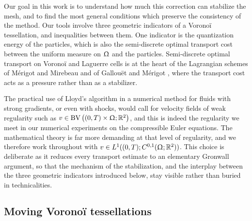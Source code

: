 \documentclass[letterpaper,11pt,twoside]{article}
\numberwithin{figure}{section}
\numberwithin{table}{section}
\theoremstyle{cpamplain}
\theoremstyle{cpamdefinition}
\newcommand{\R}{\mathbb{R}}
\let\Omega\Upomega
\numberwithin{equation}{section}
\begin{document}
Our goal in this work is to understand how much this correction can stabilize the mesh, and to find the most general conditions which preserve the consistency of the method. 
Our tools involve three geometric indicators of a Vorono\"i tessellation, and inequalities between them. One indicator is the quantization energy of the particles, which is also the semi-discrete optimal transport cost between the uniform measure on $\Omega$ and the particles. Semi-discrete optimal transport on Vorono\"i and Laguerre cells is at the heart of the Lagrangian schemes of M\'erigot and Mirebeau \cite{MerigotMirebeau2016} and of Gallou\"et and M\'erigot \cite{GallouetMerigot2018,gaga,caca}, where the transport cost acts as a pressure rather than as a stabilizer. 

The practical use of Lloyd's algorithm in a numerical method for fluids with strong gradients, or even with shocks, would call for velocity fields of weak regularity such as $v\in \mathrm{BV}\left((0,T)\times \Omega;\R^2\right)$, and this is indeed the regularity we meet in our numerical experiments on the compressible Euler equations.
The mathematical theory is far more demanding at that level of regularity, and we therefore work throughout with $v\in L^1((0,T);C^{0,1}(\Omega;\R^2))$.
This choice is deliberate as it reduces every transport estimate to an elementary Gronwall argument, so that the mechanism of the stabilization, and the interplay between the three geometric indicators introduced below, stay visible rather than buried in technicalities.


\subsection{Moving Vorono\"i tessellations}\label{sec:moving}
\end{document}
